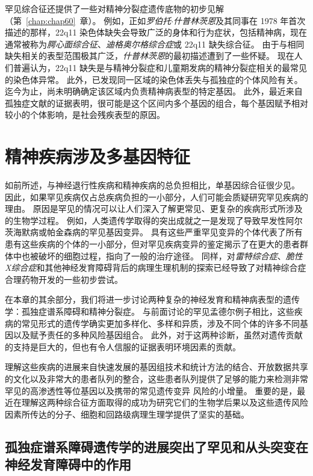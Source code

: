 罕见综合征还提供了一些对精神分裂症遗传底物的初步见解（第~\ref{chap:chap60}~章）。
例如，正如\textit{罗伯托$\cdot$什普林茨恩}及其同事在 1978 年首次描述的那样，22q11 染色体缺失会导致广泛的身体和行为症状，包括精神病，现在通常被称为\textit{腭心面综合征}、\textit{迪格奥尔格综合症}或 22q11 缺失综合征。
由于与相同缺失相关的表型范围极其广泛，\textit{什普林茨恩}的最初描述遭到了一些怀疑。
现在人们普遍认为，22q11 缺失是与精神分裂症和儿童期发病的精神分裂症相关的最常见的染色体异常。
此外，已发现同一区域的染色体丢失与孤独症的个体风险有关。
迄今为止，尚未明确确定该区域内负责精神病表型的特定基因。
此外，最近来自孤独症文献的证据表明，很可能是这个区间内多个基因的组合，每个基因赋予相对较小的个体影响，是社会残疾表型的原因。



\section{精神疾病涉及多基因特征}

如前所述，与神经退行性疾病和精神疾病的总负担相比，单基因综合征很少见。
因此，如果罕见疾病仅占总疾病负担的一小部分，人们可能会质疑研究罕见疾病的理由。
原因是罕见的情况可以让人们深入了解更常见、更复杂的疾病形式所涉及的生物学过程。
例如，人类遗传学取得的突出成就之一是发现了导致早发性阿尔茨海默病或帕金森病的罕见基因变异。
具有这些严重罕见变异的个体代表了所有患有这些疾病的个体的一小部分，但对罕见疾病变异的鉴定揭示了在更大的患者群体中也被破坏的细胞过程，指向了一般的治疗途径。
同样，对\textit{雷特综合症}、\textit{脆性X综合症}和其他神经发育障碍背后的病理生理机制的探索已经导致了对精神综合症合理药物开发的一些初步尝试。


在本章的其余部分，我们将进一步讨论两种复杂的神经发育和精神病表型的遗传学：孤独症谱系障碍和精神分裂症。
与前面讨论的罕见孟德尔例子相比，这些疾病的常见形式的遗传学确实更加多样化、多样和异质，涉及不同个体的许多不同基因以及赋予责任的多种风险基因组合。
此外，对于这两种诊断，虽然对遗传贡献的支持是巨大的，但也有令人信服的证据表明环境因素的贡献。


理解这些疾病的进展来自快速发展的基因组技术和统计方法的结合、开放数据共享的文化以及非常大的患者队列的整合，这些患者队列提供了足够的能力来检测非常罕见的高渗透性等位基因以及携带的常见遗传变异 风险的小增量。
重要的是，最近在理解这两种综合征方面取得的成功为研究它们的生物学后果以及这些遗传风险因素所传达的分子、细胞和回路级病理生理学提供了坚实的基础。



\subsection{孤独症谱系障碍遗传学的进展突出了罕见和从头突变在神经发育障碍中的作用}

